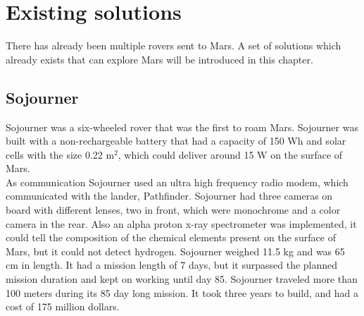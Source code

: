 \chapter{Existing solutions}\label{ch:existingSolutions}
There has already been multiple rovers sent to Mars. A set of solutions which already exists that can explore Mars will be introduced in this chapter.

\section{Sojourner}\label{ch:existingSolutions_SojournerRover}
Sojourner was a six-wheeled rover that was the first to roam Mars.
Sojourner was built with a non-rechargeable battery that had a capacity of 150 Wh and solar cells with the size 0.22 m${^2}$, which could deliver around 15 W on the surface of Mars.\\ As communication Sojourner used an ultra high frequency radio modem, which communicated with the lander, Pathfinder. Sojourner had three cameras on board with different lenses, two in front, which were monochrome and a color camera in the rear. Also an alpha proton x-ray spectrometer was implemented, it could tell the composition of the chemical elements present on the surface of Mars, but it could not detect hydrogen. Sojourner weighed 11.5 kg and was 65 cm in length. It had a mission length of 7 days, but it surpassed the planned mission duration and kept on working until day 85. Sojourner traveled more than 100 meters during its 85 day long mission. It took three years to build, and had a cost of 175 million dollars\cite{Sojounerroverjpl}.

